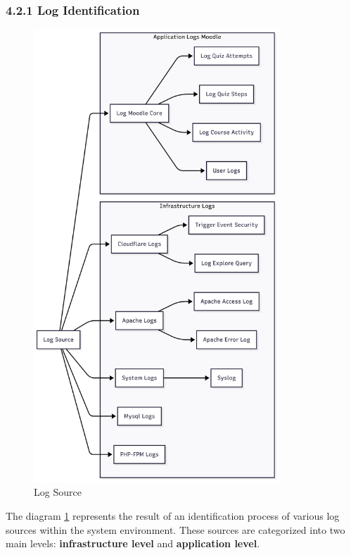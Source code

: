 \subsubsection{4.2.1 Log Identification}
\begin{figure}[H] 
	\centering
	\includegraphics[height=17cm]{figure/log-source.png}
	\caption{Log Source}
	\label{fig:log-source}
\end{figure}
The diagram \ref{fig:log-source} represents the result of an identification process of various log sources within the system environment. These sources are categorized into two main levels: \textbf{infrastructure level} and \textbf{application level}.


